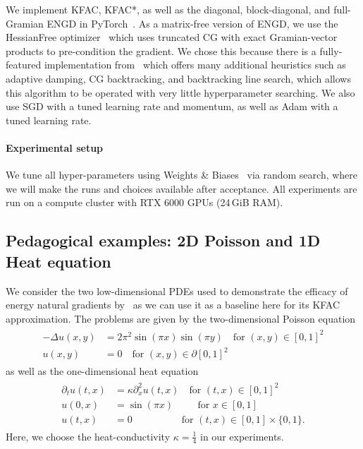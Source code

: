


We implement KFAC, KFAC*, as well as the diagonal, block-diagonal, and 
full-Gramian ENGD in PyTorch~\citep{paszke2019pytorch}.
As a matrix-free version of ENGD, we use the HessianFree optimizer~\citep{?} which uses truncated CG with exact Gramian-vector products to pre-condition the gradient.
We chose this because there is a fully-featured implementation from~\citet{tatzel2022late} which offers many additional heuristics such as adaptive damping, CG backtracking, and backtracking line search, which allows this algorithm to be operated with very little hyperparameter searching.
We also use SGD with a tuned learning rate and momentum, as well as Adam with a tuned learning rate.

\paragraph{Experimental setup}
We tune all hyper-parameters using Weights \& Biases~\citep{wandb} via random search, where we will make the runs and choices available after acceptance. 
All experiments are run on a compute cluster with RTX 6000 GPUs (24\,GiB RAM).


\subsection{Pedagogical examples: 2D Poisson and 1D Heat equation}

We consider the two low-dimensional PDEs used to demonstrate the efficacy of energy natural gradients by~\cite{muller2023achieving}
as we can use it as a baseline here for its KFAC approximation. 
The problems are given by the two-dimensional Poisson equation 
\begin{align}\label{eq:2D-Poisson}
    \begin{split}
        -\Delta u(x,y) & = 2\pi^2 \sin(\pi x) \sin(\pi y) \quad \text{for } (x,y)\in[0,1]^2 \\ 
    u(x,y) & = 0 \quad \text{for } (x,y) \in\partial[0,1]^2
    \end{split}
\end{align}
as well as the one-dimensional heat equation 
\begin{align}\label{eq:1D-Heat}
    \begin{split}
        \partial_t u(t,x) &= \kappa\partial_x^2u(t,x) \quad \text{for }(t,x)\in[0,1]^2
        \\
        u(0,x) &= \sin(\pi x) \qquad\;\, \text{for }x\in[0,1]
        \\
        u(t,x) &= 0 \qquad\qquad\quad\text{for }(t,x)\in[0,1]\times\{0,1\}.
    \end{split}
\end{align}
Here, we choose the heat-conductivity $\kappa = \frac14$ in our experiments. 

